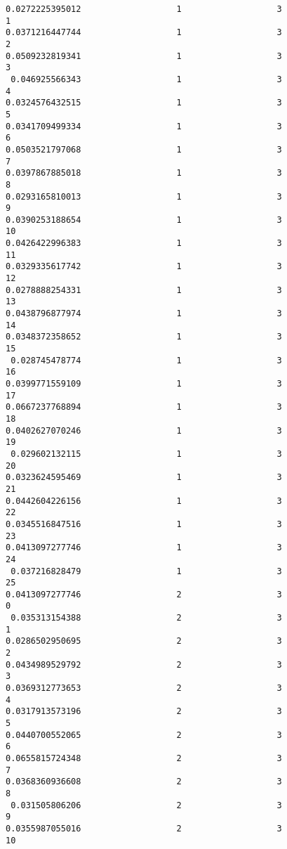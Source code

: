 \begin{Verbatim}[fontsize=\scriptsize,frame=single]
0.0272225395012                   1                   3                1
0.0371216447744                   1                   3                2
0.0509232819341                   1                   3                3
 0.046925566343                   1                   3                4
0.0324576432515                   1                   3                5
0.0341709499334                   1                   3                6
0.0503521797068                   1                   3                7
0.0397867885018                   1                   3                8
0.0293165810013                   1                   3                9
0.0390253188654                   1                   3               10
0.0426422996383                   1                   3               11
0.0329335617742                   1                   3               12
0.0278888254331                   1                   3               13
0.0438796877974                   1                   3               14
0.0348372358652                   1                   3               15
 0.028745478774                   1                   3               16
0.0399771559109                   1                   3               17
0.0667237768894                   1                   3               18
0.0402627070246                   1                   3               19
 0.029602132115                   1                   3               20
0.0323624595469                   1                   3               21
0.0442604226156                   1                   3               22
0.0345516847516                   1                   3               23
0.0413097277746                   1                   3               24
 0.037216828479                   1                   3               25
0.0413097277746                   2                   3                0
 0.035313154388                   2                   3                1
0.0286502950695                   2                   3                2
0.0434989529792                   2                   3                3
0.0369312773653                   2                   3                4
0.0317913573196                   2                   3                5
0.0440700552065                   2                   3                6
0.0655815724348                   2                   3                7
0.0368360936608                   2                   3                8
 0.031505806206                   2                   3                9
0.0355987055016                   2                   3               10

\end{Verbatim}
